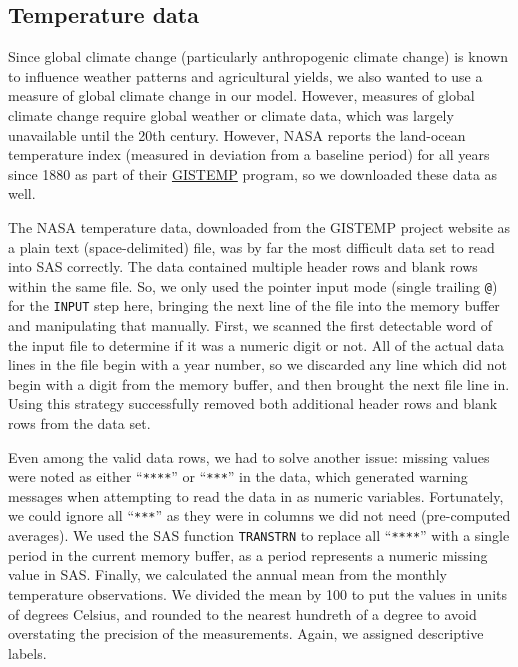 \documentclass[11pt]{article}
\begin{document}
\subsection*{Temperature data}

Since global climate change (particularly anthropogenic climate change) is
known to influence weather patterns and agricultural yields, we also wanted to
use a measure of global climate change in our model. However, measures of
global climate change require global weather or climate data, which was largely
unavailable until the 20th century. However, NASA reports the land-ocean
temperature index (measured in deviation from a baseline period) for all years
since 1880 as part of their \href{https://data.giss.nasa.gov/gistemp/}{GISTEMP}
program, so we downloaded these data as well.

The NASA temperature data, downloaded from the GISTEMP project website as a
plain text (space-delimited) file, was by far the most difficult data set to
read into SAS correctly. The data contained multiple header rows and blank rows
within the same file. So, we only used the pointer input mode (single trailing
\texttt{@}) for the \texttt{INPUT} step here, bringing the next line of the
file into the memory buffer and manipulating that manually. First, we scanned
the first detectable word of the input file to determine if it was a numeric
digit or not. All of the actual data lines in the file begin with a year
number, so we discarded any line which did not begin with a digit from the
memory buffer, and then brought the next file line in. Using this strategy
successfully removed both additional header rows and blank rows from the data
set.

Even among the valid data rows, we had to solve another issue: missing values
were noted as either ``\texttt{****}'' or ``\texttt{***}'' in the data, which
generated warning messages when attempting to read the data in as numeric
variables. Fortunately, we could ignore all ``\texttt{***}'' as they were in
columns we did not need (pre-computed averages). We used the SAS function
\texttt{TRANSTRN} to replace all ``\texttt{****}'' with a single period in the
current memory buffer, as a period represents a numeric missing value in SAS.
Finally, we calculated the annual mean from the monthly temperature
observations. We divided the mean by 100 to put the values in units of degrees
Celsius, and rounded to the nearest hundreth of a degree to avoid overstating
the precision of the measurements. Again, we assigned descriptive labels.
\end{document}
